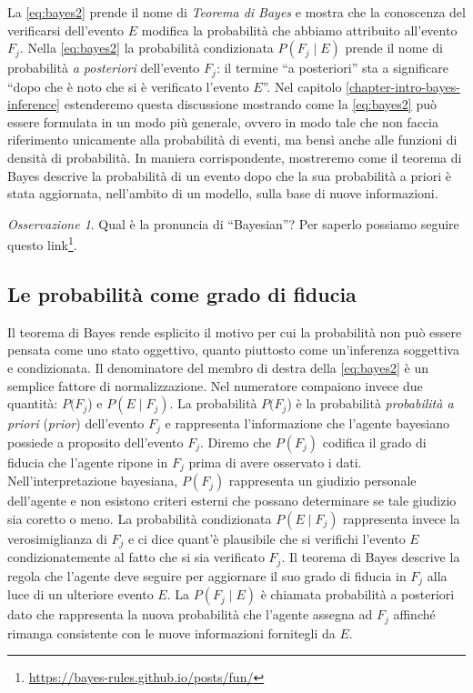 \documentclass[
  11pt,
]{krantz}
\renewcommand{\href}[2]{#2\footnote{\url{#1}}}
\theoremstyle{definition}
\theoremstyle{definition}
\theoremstyle{definition}
\theoremstyle{definition}
\theoremstyle{remark}
\newtheorem*{remark}{Osservazione}
\begin{document}
\noindent La \eqref{eq:bayes2} prende il nome di \emph{Teorema di Bayes} e mostra che la conoscenza del verificarsi dell'evento \(E\) modifica la probabilità che abbiamo attribuito all'evento \(F_j\). Nella \eqref{eq:bayes2} la probabilità condizionata \(P(F_j \mid E)\) prende il nome di probabilità \emph{a posteriori} dell'evento \(F_j\): il termine ``a posteriori'' sta a significare ``dopo che è noto che si è verificato l'evento \(E\)''. Nel capitolo \ref{chapter-intro-bayes-inference} estenderemo questa discussione mostrando come la \eqref{eq:bayes2} può essere formulata in un modo più generale, ovvero in modo tale che non faccia riferimento unicamente alla probabilità di eventi, ma bensì anche alle funzioni di densità di probabilità. In maniera corrispondente, mostreremo come il teorema di Bayes descrive la probabilità di un evento dopo che la sua probabilità a priori è stata aggiornata, nell'ambito di un modello, sulla base di nuove informazioni.

\begin{remark}
Qual è la pronuncia di ``Bayesian''? Per saperlo possiamo seguire \href{https://bayes-rules.github.io/posts/fun/}{questo link}.
\end{remark}

\hypertarget{le-probabilita-come-grado-di-fiducia}{%
\subsection{Le probabilità come grado di fiducia}\label{le-probabilita-come-grado-di-fiducia}}

Il teorema di Bayes rende esplicito il motivo per cui la probabilità non può essere pensata come uno stato oggettivo, quanto piuttosto come un'inferenza soggettiva e condizionata. Il denominatore del membro di destra della \eqref{eq:bayes2} è un semplice fattore di normalizzazione. Nel numeratore compaiono invece due quantità: \(P(F_j\)) e \(P(E \mid F_j)\). La probabilità \(P(F_j\)) è la probabilità \emph{probabilità a priori} (\emph{prior}) dell'evento \(F_j\) e rappresenta l'informazione che l'agente bayesiano possiede a proposito dell'evento \(F_j\). Diremo che \(P(F_j)\) codifica il grado di fiducia che l'agente ripone in \(F_j\) prima di avere osservato i dati. Nell'interpretazione bayesiana, \(P(F_j)\) rappresenta un giudizio personale dell'agente e non esistono criteri esterni che possano determinare se tale giudizio sia coretto o meno. La probabilità condizionata \(P(E \mid F_j)\) rappresenta invece la verosimiglianza di \(F_j\) e ci dice quant'è plausibile che si verifichi l'evento \(E\) condizionatemente al fatto che si sia verificato \(F_j\). Il teorema di Bayes descrive la regola che l'agente deve seguire per aggiornare il suo grado di fiducia in \(F_j\) alla luce di un ulteriore evento \(E\). La \(P(F_j \mid E)\) è chiamata probabilità a posteriori dato che rappresenta la nuova probabilità che l'agente assegna ad \(F_j\) affinché rimanga consistente con le nuove informazioni fornitegli da \(E\).
\end{document}
